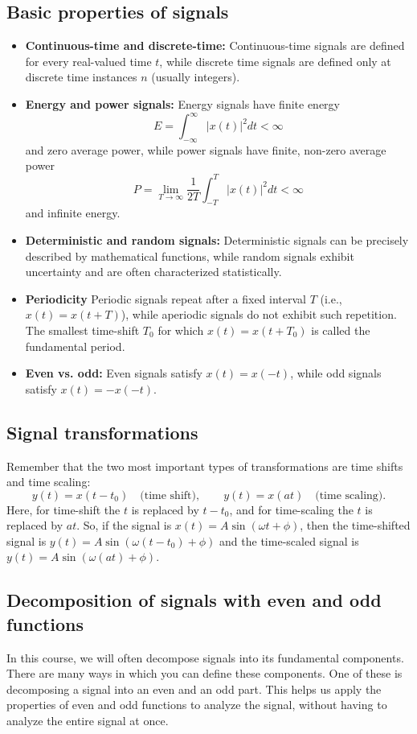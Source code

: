 \documentclass{ee102_notes}
\begin{document}
\subsection{Basic properties of signals}
\begin{itemize}
  \item \textbf{Continuous-time and discrete-time:} Continuous-time signals are defined for every real-valued time \(t\), while discrete time signals are defined only at discrete time instances \(n\) (usually integers).
  \item \textbf{Energy and power signals:} Energy signals have finite energy \[E = \int_{-\infty}^{\infty} |x(t)|^2 dt < \infty\] and zero average power, while power signals have finite, non-zero average power \[P = \lim_{T \to \infty} \frac{1}{2T} \int_{-T}^{T} |x(t)|^2 dt < \infty\] and infinite energy.
  \item \textbf{Deterministic and random signals:} Deterministic signals can be precisely described by mathematical functions, while random signals exhibit uncertainty and are often characterized statistically.
  \item \textbf{Periodicity} Periodic signals repeat after a fixed interval \(T\) (i.e., \(x(t) = x(t+T)\)), while aperiodic signals do not exhibit such repetition. The smallest time-shift $T_0$ for which \(x(t) = x(t+T_0)\) is called the fundamental period.
  \item \textbf{Even vs. odd:} Even signals satisfy \(x(t) = x(-t)\), while odd signals satisfy \(x(t) = -x(-t)\).
\end{itemize}
\subsection{Signal transformations}
Remember that the two most important types of transformations are time shifts and time scaling: 
\[
y(t) = x(t - t_0) \quad \text{(time shift)}, \qquad y(t) = x(a t) \quad \text{(time scaling)}.
\]
Here, for time-shift the $t$ is replaced by $t - t_0$, and for time-scaling the $t$ is replaced by $a t$. So, if the signal is $x(t) = A\sin(\omega t + \phi)$, then the time-shifted signal is $y(t) = A\sin(\omega (t - t_0) + \phi)$ and the time-scaled signal is $y(t) = A\sin(\omega (a t) + \phi)$. 
\subsection{Decomposition of signals with even and odd functions}
In this course, we will often decompose signals into its fundamental components. There are many ways in which you can define these components. One of these is decomposing a signal into an even and an odd part. This helps us apply the properties of even and odd functions to analyze the signal, without having to analyze the entire signal at once.
\end{document}
